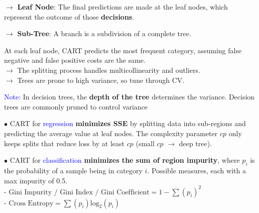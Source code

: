 \documentclass[letterpaper, 10.5pt,landscape]{article}
\begin{document}
\begin{multicols*}{3}
$\rightarrow$ \textbf{Leaf Node}: The final predictions are made at the leaf nodes, which represent the outcome of those \textbf{decisions}.

$\rightarrow$ \textbf{Sub-Tree}: A branch is a subdivision of a complete tree. 


\vspace{3pt}
At each leaf node, CART predicts the most frequent category, assuming false negative and false positive costs are the same. \\

$\rightarrow$ The splitting process handles multicollinearity and outliers. \\
$\rightarrow$ Trees are prone to high variance, so tune through CV.

\vspace{2pt}
\textcolor{blue}{Note:} In decision trees, the \textbf{depth of the tree} determines the variance. Decision trees are commonly pruned to control variance


\vspace{3pt} 


$\bullet$ CART for \textcolor{blue}{regression } \textbf{minimizes SSE} by splitting data into sub-regions and predicting the average value at leaf nodes. The complexity parameter $cp$ only keeps splits that reduce loss by at least $cp$ (small $cp$ $\rightarrow$ deep tree). 

\vspace{2pt}
$\bullet$ CART for \textcolor{blue}{classification }
\textbf{minimizes the sum of region impurity}, where $p_{i}$ is the probability of a sample being in category $i$. Possible measures, each with a max impurity of 0.5.
\\

- \( \boxed{\text{Gini Impurity / Gini Index / Gini Coefficient} = 1 - \sum(p_{i})^{2}} \) \\
- \(\boxed{
\text{Cross Entropy} = \sum(p_{i})\text{log}_{2}(p_{i})} \)




\end{multicols*}
\end{document}
